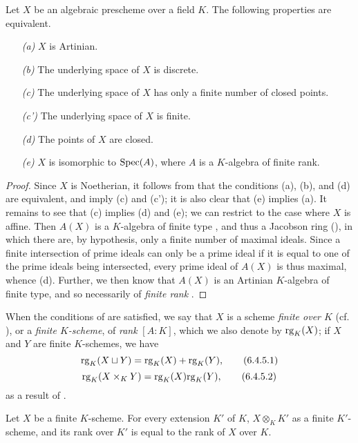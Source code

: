 \begin{prop}[6.4.4]
\label{1.6.4.4}
Let $X$ be an algebraic prescheme over a field $K$.
The following properties are equivalent.
\begin{enumerate}
    \item[\emph{(a)}] $X$ is Artinian.
    \item[\emph{(b)}] The underlying space of $X$ is discrete.
    \item[\emph{(c)}] The underlying space of $X$ has only a finite number of closed points.
    \item[\emph{(c')}] The underlying space of $X$ is finite.
    \item[\emph{(d)}] The points of $X$ are closed.
    \item[\emph{(e)}] $X$ is isomorphic to ${\mathop{\mathrm{Spec}}\nolimits}(A)$, where $A$ is a $K$-algebra of finite rank.
\end{enumerate}
\end{prop}

\begin{proof}
\label{proof-1.6.4.4}
Since $X$ is Noetherian, it follows from  that the conditions (a), (b), and (d) are equivalent, and imply (c) and (c');
it is also clear that (e) implies (a).
It remains to see that (c) implies (d) and (e);
we can restrict to the case where $X$ is affine.
Then $A(X)$ is a $K$-algebra of finite type , and thus a Jacobson ring (\cite[p.~3-11 and 3-12]{I-1}), in which there are, by hypothesis, only a finite number of maximal ideals.
Since a finite intersection of prime ideals can only be a prime ideal if it is equal to one of the prime ideals being intersected, every prime ideal of $A(X)$ is thus maximal, whence (d).
Further, we then know  that $A(X)$ is an Artinian $K$-algebra of finite type, and so necessarily of \emph{finite rank} \cite{I-21}.
\end{proof}

\begin{env}[6.4.5]
\label{1.6.4.5}
When the conditions of  are satisfied, we say that $X$ is a scheme \emph{finite over $K$} (cf. ), or a \emph{finite $K$-scheme}, of \emph{rank} $[A:K]$, which we also denote by ${\mathop{\mathrm{rg}}\nolimits}_K(X)$;
if $X$ and $Y$ are finite $K$-schemes, we have
\[
  {\mathop{\mathrm{rg}}\nolimits}_K(X\sqcup Y)={\mathop{\mathrm{rg}}\nolimits}_K(X)+{\mathop{\mathrm{rg}}\nolimits}_K(Y),
  \tag{6.4.5.1}
\]
\[
  {\mathop{\mathrm{rg}}\nolimits}_K(X\times_K Y)={\mathop{\mathrm{rg}}\nolimits}_K(X){\mathop{\mathrm{rg}}\nolimits}_K(Y),
  \tag{6.4.5.2}
\]
as a result of .
\end{env}

\begin{cor}[6.4.6]
\label{1.6.4.6}
Let $X$ be a finite $K$-scheme.
For every extension $K'$ of $K$, $X\otimes_K K'$ as a finite $K'$-scheme, and its rank over $K'$ is equal to the rank of $X$ over $K$.
\end{cor}

